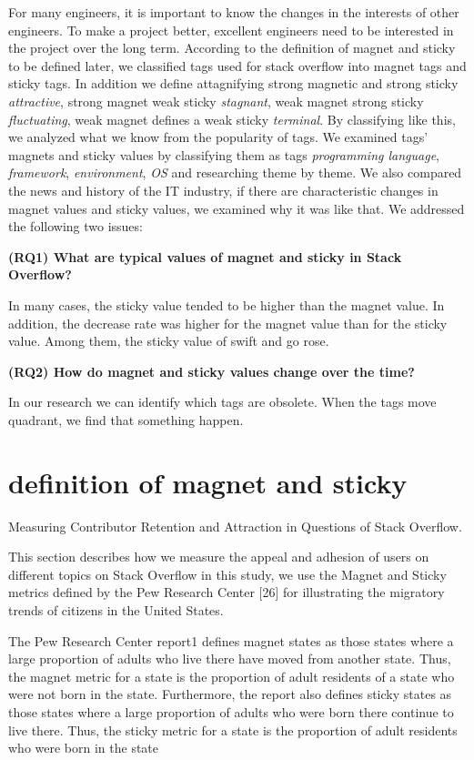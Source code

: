 \documentclass[conference]{IEEEtran}
\begin{document}
\smallskip
For many engineers, it is important to know the changes in the interests of other engineers. To make a project better, excellent engineers need to be interested in the project over the long term. According to the definition of magnet and sticky to be defined later, we classified tags used for stack overflow into magnet tags and sticky tags. In addition we define attagnifying strong magnetic and strong sticky \emph{attractive}, strong magnet weak sticky \emph{stagnant}, weak magnet strong sticky \emph{fluctuating}, weak magnet defines a weak sticky \emph{terminal}. By classifying like this, we analyzed what we know from the popularity of tags. We examined tags' magnets and sticky values by classifying them as tags \emph{programming language}, \emph{framework}, \emph{environment}, \emph{OS} and researching theme by theme. We also compared the news and history of the IT industry, if there are characteristic changes in magnet values and sticky values, we examined why it was like that. We addressed the following two issues:
\par
\smallskip

\textbf{(RQ1) What are typical values of magnet and sticky in Stack Overflow?}\par
In many cases, the sticky value tended to be higher than the magnet value. In addition, the decrease rate was higher for the magnet value than for the sticky value. Among them, the sticky value of swift and go rose.
\smallskip

\textbf{(RQ2) How do magnet and sticky values change over the time?}\par
In our research we can identify which tags are obsolete. When the tags move quadrant, we find that something happen.

\section{definition of magnet and sticky}
Measuring Contributor Retention and Attraction in Questions of Stack Overflow.

This section describes how we measure the appeal and adhesion of users on different topics on Stack Overflow in this study, we use the Magnet and Sticky metrics defined by the Pew Research Center [26] for illustrating the migratory trends of citizens in the United States.

The Pew Research Center report1 defines magnet states as those states where a large proportion of adults who live there have moved from another state. Thus, the magnet metric for a state is the proportion of adult residents of a state who were not born in the state. Furthermore, the report also defines sticky states as those states where a large proportion of adults who were born there continue to live there. Thus, the sticky metric for a state is the proportion of adult residents who were born in the state
\end{document}

